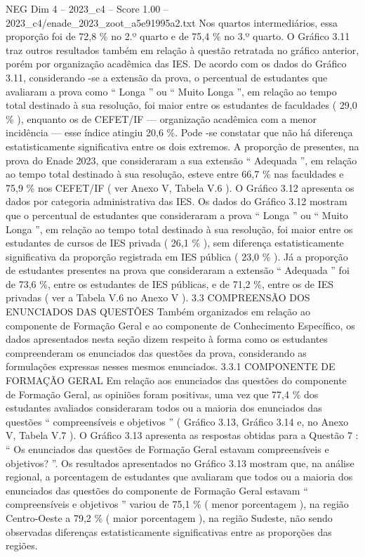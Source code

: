 \begin{textsample}{NEG Dim 4 – 2023\_c4 – Score 1.00 – 2023\_c4/enade\_2023\_zoot\_a5e91995a2.txt}
Nos quartos intermediários, essa proporção foi de 72,8 \% no 2.º quarto e de 75,4 \% no 3.º quarto.
O Gráfico 3.11 traz outros resultados também em relação à questão retratada no gráfico anterior, porém por organização acadêmica das IES.
De acordo com os dados do Gráfico 3.11, considerando -se a extensão da prova, o percentual de estudantes que avaliaram a prova como “ Longa ” ou “ Muito Longa ”, em relação ao tempo total destinado à sua resolução, foi maior entre os estudantes de faculdades ( 29,0 \% ), enquanto os de CEFET/IF — organização acadêmica com a menor incidência — esse índice atingiu 20,6 \%.
Pode -se constatar que não há diferença estatisticamente significativa entre os dois extremos.
A proporção de presentes, na prova do Enade 2023, que consideraram a sua extensão “ Adequada ”, em relação ao tempo total destinado à sua resolução, esteve entre 66,7 \% nas faculdades e 75,9 \% nos CEFET/IF ( ver Anexo V, Tabela V.6 ).
O Gráfico 3.12 apresenta os dados por categoria administrativa das IES.
Os dados do Gráfico 3.12 mostram que o percentual de estudantes que consideraram a prova “ Longa ” ou “ Muito Longa ”, em relação ao tempo total destinado à sua resolução, foi maior entre os estudantes de cursos de IES privada ( 26,1 \% ), sem diferença estatisticamente significativa da proporção registrada em IES pública ( 23,0 \% ).
Já a proporção de estudantes presentes na prova que consideraram a extensão “ Adequada ” foi de 73,6 \%, entre os estudantes de IES públicas, e de 71,2 \%, entre os de IES privadas ( ver a Tabela V.6 no Anexo V ). 3.3 COMPREENSÃO DOS ENUNCIADOS DAS QUESTÕES Também organizados em relação ao componente de Formação Geral e ao componente de Conhecimento Específico, os dados apresentados nesta seção dizem respeito à forma como os estudantes compreenderam os enunciados das questões da prova, considerando as formulações expressas nesses mesmos enunciados. 3.3.1 COMPONENTE DE FORMAÇÃO GERAL Em relação aos enunciados das questões do componente de Formação Geral, as opiniões foram positivas, uma vez que 77,4 \% dos estudantes avaliados consideraram todos ou a maioria dos enunciados das questões “ compreensíveis e objetivos ” ( Gráfico 3.13, Gráfico 3.14 e, no Anexo V, Tabela V.7 ).
O Gráfico 3.13 apresenta as respostas obtidas para a Questão 7 : “ Os enunciados das questões de Formação Geral estavam compreensíveis e objetivos? ”.
Os resultados apresentados no Gráfico 3.13 mostram que, na análise regional, a porcentagem de estudantes que avaliaram que todos ou a maioria dos enunciados das questões do componente de Formação Geral estavam “ compreensíveis e objetivos ” variou de 75,1 \% ( menor porcentagem ), na região Centro-Oeste a 79,2 \% ( maior porcentagem ), na região Sudeste, não sendo observadas diferenças estatisticamente significativas entre as proporções das regiões.

\end{textsample}

